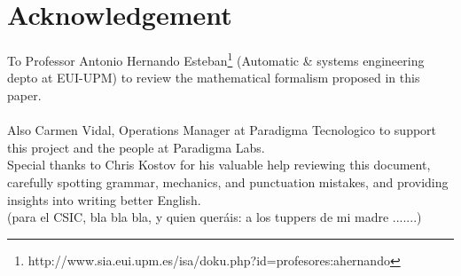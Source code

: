 \newpage

\section{Acknowledgement}

To Professor Antonio Hernando Esteban\footnote{http://www.sia.eui.upm.es/isa/doku.php?id=profesores:ahernando}  (Automatic \& systems engineering depto at EUI-UPM) to review the mathematical formalism proposed in this paper.
\\
\\
Also Carmen Vidal, Operations Manager at Paradigma Tecnologico to support this project and the people at Paradigma Labs.
\\
Special thanks to Chris Kostov for his valuable help reviewing this document, carefully spotting grammar, mechanics, and punctuation mistakes, and providing insights into writing better English.
\\
(para el CSIC, bla bla bla, y quien queráis: a los tuppers de mi madre .......)
